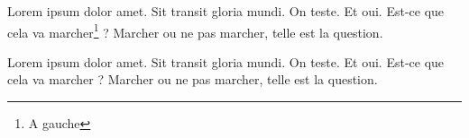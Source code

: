 \documentclass[twoside]{book}
\begin{document}
\begin{pairs}
\begin{Leftside}
\beginnumbering
\pstart
Lorem ipsum dolor amet. Sit transit gloria mundi.
On teste. Et oui. Est-ce que cela va marcher\footnote{A gauche} ? Marcher ou ne pas marcher, telle est la question.
\pend
\endnumbering
\end{Leftside}

\begin{Rightside}
\beginnumbering
\pstart
Lorem ipsum dolor amet\footnotemk. Sit transit gloria mundi.
On teste. Et oui. Est-ce que cela va marcher ? Marcher ou ne pas marcher, telle est la question\footnotemk.
\pend
\endnumbering
\end{Rightside}
\end{pairs}

\Columns
\end{document}
